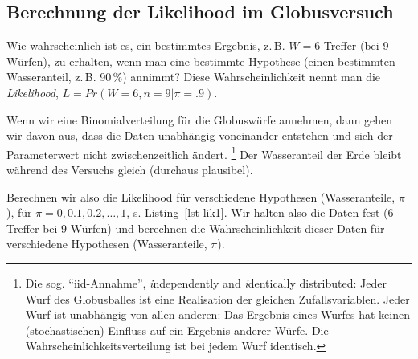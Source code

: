 \documentclass[
  ngerman,
  letterpaper,
  twoside,
  open=any]{scrbook}
\theoremstyle{definition}
\theoremstyle{plain}
\theoremstyle{definition}
\theoremstyle{definition}
\theoremstyle{definition}
\theoremstyle{definition}
\theoremstyle{remark}
\begin{document}
\subsection{Berechnung der Likelihood im
Globusversuch}\label{berechnung-der-likelihood-im-globusversuch}

Wie wahrscheinlich ist es, ein bestimmtes Ergebnis, z.\,B. \(W=6\)
Treffer (bei 9 Würfen), zu erhalten, wenn man eine bestimmte Hypothese
(einen bestimmten Wasseranteil, z.\,B. 90\,\%) annimmt? Diese
Wahrscheinlichkeit nennt man die \emph{Likelihood},
\(L = Pr(W = 6, n = 9| \pi=.9)\).

Wenn wir eine Binomialverteilung für die Globuswürfe annehmen, dann
gehen wir davon aus, dass die Daten unabhängig voneinander entstehen und
sich der Parameterwert nicht zwischenzeitlich ändert. \footnote{Die sog.
  \enquote{iid-Annahme}, \emph{i}ndependently and \emph{i}dentically
  distributed: Jeder Wurf des Globusballes ist eine Realisation der
  gleichen Zufallsvariablen. Jeder Wurf ist unabhängig von allen
  anderen: Das Ergebnis eines Wurfes hat keinen (stochastischen)
  Einfluss auf ein Ergebnis anderer Würfe. Die
  Wahrscheinlichkeitsverteilung ist bei jedem Wurf identisch.} Der
Wasseranteil der Erde bleibt während des Versuchs gleich (durchaus
plausibel).

Berechnen wir also die Likelihood für verschiedene Hypothesen
(Wasseranteile, \(\pi\)), für \(\pi = 0, 0.1, 0.2, \ldots, 1\), s.
Listing~\ref{lst-lik1}. Wir halten also die Daten fest (6 Treffer bei 9
Würfen) und berechnen die Wahrscheinlichkeit dieser Daten für
verschiedene Hypothesen (Wasseranteile, \(\pi\)).
\end{document}
